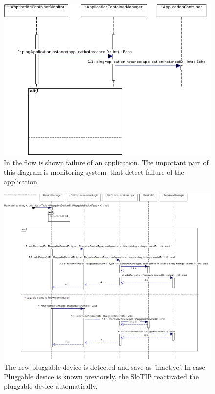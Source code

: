     \begin{figure}[!htp]
    	\centering
    	\includegraphics[width=\textwidth]{images/sequence-Av2}
    	\caption[Application crash]{ In the flow is shown failure of an application. The important part of this diagram is monitoring system, that detect failure of the application. }\label{fig:seq_scenario5}
    \end{figure}

    \begin{figure}[!htp]
    	\centering
    	\includegraphics[width=\textwidth]{images/sequence-U2-UC4}
    	\caption[Plugging in a new pluggable device (sensor or actuator)]{ The new pluggable device is detected and save as 'inactive'. In case Pluggable device is known previously, the SloTIP reactivated the pluggable device automatically.}\label{fig:seq_scenario6}
    \end{figure}

